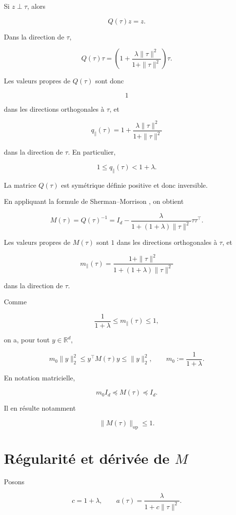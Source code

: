 Si \(z\perp\tau\), alors

\[
Q(\tau)z=z.
\]

Dans la direction de \(\tau\),

\[
Q(\tau)\tau
=
\left(
1+
\frac{\lambda\|\tau\|^2}
{1+\|\tau\|^2}
\right)\tau.
\]

Les valeurs propres de \(Q(\tau)\) sont donc

\[
1
\]

dans les directions orthogonales à \(\tau\), et

\[
q_\parallel(\tau)
=
1+
\frac{\lambda\|\tau\|^2}
{1+\|\tau\|^2}
\]

dans la direction de \(\tau\). En particulier,

\[
1\leq q_\parallel(\tau)<1+\lambda.
\]

La matrice \(Q(\tau)\) est symétrique définie positive et donc
inversible.

En appliquant la formule de Sherman--Morrison
\cite{sherman1950adjustment}, on obtient

\[
\boxed{
M(\tau)
=
Q(\tau)^{-1}
=
I_d
-
\frac{\lambda}
{1+(1+\lambda)\|\tau\|^2}
\tau\tau^\top.
}
\]

Les valeurs propres de \(M(\tau)\) sont \(1\) dans les directions
orthogonales à \(\tau\), et

\[
m_\parallel(\tau)
=
\frac{1+\|\tau\|^2}
{1+(1+\lambda)\|\tau\|^2}
\]

dans la direction de \(\tau\).

Comme

\[
\frac{1}{1+\lambda}
\leq
m_\parallel(\tau)
\leq1,
\]

on a, pour tout \(y\in\mathbb R^d\),

\[
\boxed{
m_0\|y\|_2^2
\leq
y^\top M(\tau)y
\leq
\|y\|_2^2,
\qquad
m_0:=\frac{1}{1+\lambda}.
}
\]

En notation matricielle,

\[
\boxed{
m_0I_d
\preceq
M(\tau)
\preceq
I_d.
}
\]

Il en résulte notamment

\[
\boxed{
\|M(\tau)\|_{\mathrm{op}}\leq1.
}
\]

\section{Régularité et dérivée de \texorpdfstring{$M$}{M}}
\label{annexe-existence-derivee-M}

Posons

\[
c=1+\lambda,
\qquad
a(\tau)
=
\frac{\lambda}{1+c\|\tau\|^2}.
\]

